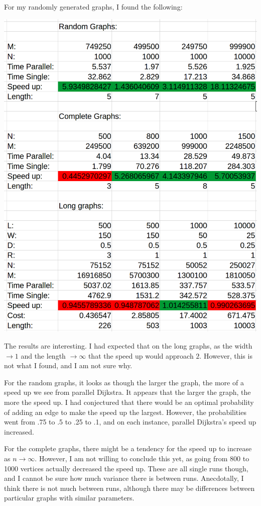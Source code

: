 \documentclass{article}
\begin{document}
For my randomly generated graphs, I found the following:

\includegraphics[scale=0.25]{summary2.png}

The results are interesting.
I had expected that on the long graphs, as the width $\to 1$ and the length $\to \infty$ that the speed up would approach $2$.
However, this is not what I found, and I am not sure why.

For the random graphs, it looks as though the larger the graph, the more of a speed up we see from parallel Dijkstra.
It appears that the larger the graph, the more the speed up.
I had conjectured that there would be an optimal probability of adding an edge to make the speed up the largest.
However, the probabilities went from .75 to .5 to .25 to .1, and on each instance, parallel Dijkstra's speed up increased.

For the complete graphs, there might be a tendency for the speed up to increase as $n\to\infty$.
However, I am not willing to conclude this yet, as going from 800 to 1000 vertices actually decreased the speed up.
These are all single runs though, and I cannot be sure how much variance there is between runs.
Anecdotally, I think there is not much between runs, although there may be differences between particular graphs with similar parameters.
\end{document}
